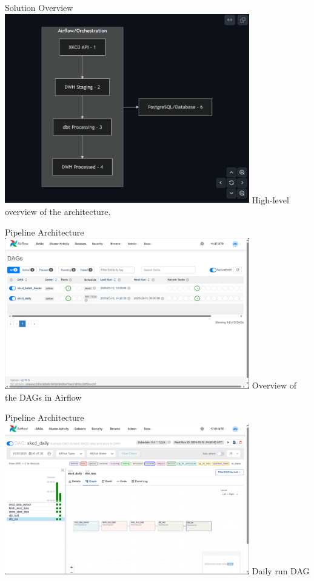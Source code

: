 \documentclass{beamer}
\begin{document}
\begin{frame}{Solution Overview}
    \centering
    \includegraphics[width=0.8\textwidth]{../screenshots/solution_overview.png}
    \newline
    High-level overview of the architecture.
\end{frame}

\begin{frame}{Pipeline Architecture}
    \centering
    \includegraphics[width=0.8\textwidth]{../screenshots/airflow.png}
    \newline
    Overview of the DAGs in Airflow
\end{frame}

\begin{frame}{Pipeline Architecture}
    \centering
    \includegraphics[width=0.8\textwidth]{../screenshots/airflow-dag.png}
    \newline
    Daily run DAG
\end{frame}
\end{document}
